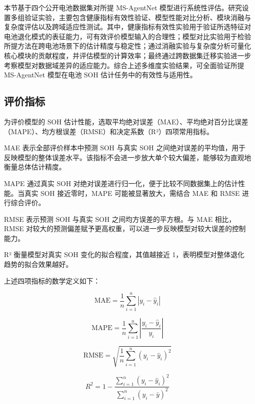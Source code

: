 本节基于四个公开电池数据集对所提 MS-AgentNet 模型进行系统性评估。研究设置多组验证实验，主要包含健康指标有效性验证、模型性能对比分析、模块消融与复杂度评估以及跨域适应性测试。其中，健康指标有效性实验用于验证所选特征对电池退化模式的表征能力，可有效评价模型输入的合理性；模型对比实验用于检验所提方法在跨电池场景下的估计精度与稳定性；通过消融实验与复杂度分析可量化核心模块的贡献程度，并评估模型的计算效率；最终通过跨数据集迁移实验进一步考察模型对数据域差异的适应能力。综合上述多维度实验结果，可全面验证所提 MS-AgentNet 模型在电池 SOH 估计任务中的有效性与适用性。

\subsection{评价指标}

为评价模型的 SOH 估计性能，选取平均绝对误差（MAE）、平均绝对百分比误差（MAPE）、均方根误差（RMSE）和决定系数（R²）四项常用指标\cite{ref76}。

MAE 表示全部评价样本中预测 SOH 与真实 SOH 之间绝对误差的平均值，用于反映模型的整体误差水平。该指标不会进一步放大单个较大偏差，能够较为直观地衡量总体估计精度。

MAPE 通过真实 SOH 对绝对误差进行归一化，便于比较不同数据集上的估计性能。当真实 SOH 接近零时，MAPE 可能被显著放大，需结合 MAE 和 RMSE 进行综合评价。

RMSE 表示预测 SOH 与真实 SOH 之间均方误差的平方根。与 MAE 相比，RMSE 对较大的预测偏差赋予更高权重，可以进一步反映模型对较大误差的控制能力。

R² 衡量模型对真实 SOH 变化的拟合程度，其值越接近 1，表明模型对整体退化趋势的拟合效果越好。

上述四项指标的数学定义如下：

\begin{equation}
\label{eq:metric_mae}
\mathrm{MAE}=\frac{1}{n}\sum_{i=1}^{n}\left|y_i-\hat{y}_i\right|
\end{equation}

\begin{equation}
\label{eq:metric_mape}
\mathrm{MAPE}=\frac{1}{n}\sum_{i=1}^{n}\left|\frac{y_i-\hat{y}_i}{y_i}\right|
\end{equation}

\begin{equation}
\label{eq:metric_rmse}
\mathrm{RMSE}=\sqrt{\frac{1}{n}\sum_{i=1}^{n}\left(y_i-\hat{y}_i\right)^2}
\end{equation}

\begin{equation}
\label{eq:metric_r2}
R^2=1-\frac{\sum_{i=1}^{n}\left(y_i-\hat{y}_i\right)^2}{\sum_{i=1}^{n}\left(y_i-\bar{y}\right)^2}
\end{equation}

